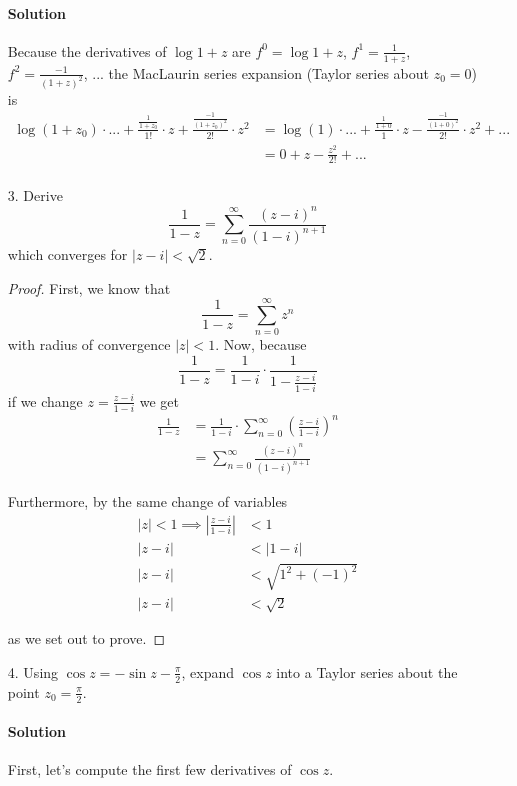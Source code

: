 \documentclass[11pt]{article}
\begin{document}
\begin{enumerate}
		\paragraph{Solution}
		Because the derivatives of $\log{1 + z}$ are $f^{0} = \log{1+z}$, $f^{1} = \frac{1}{1+z}$,
		$f^{2} = \frac{-1}{(1+z)^2}$, ...
		the MacLaurin series expansion (Taylor series about $z_0 = 0$) is
		\[
		\begin{aligned}
		\log(1 + z_0) \cdot ... + \frac{\frac{1}{1+z_0}}{1!}\cdot z +
		\frac{\frac{-1}{(1+z_0)^2}}{2!}\cdot z^2
		&= \log(1)\cdot ... + \frac{\frac{1}{1 + 0}}{1}\cdot z - \frac{\frac{-1}{(1+0)^2}}{2!} \cdot z^2 + ... \\
		&= 0 + z - \frac{z^2}{2!} + ...\\
		\end{aligned}
		\]
		\item[3.] Derive
		\[\frac{1}{1-z} = \sum^{\infty}_{n=0} \frac{(z-i)^n}{(1-i)^{n+1}} \]
		which converges for $|z - i| < \sqrt{2}$.
		\begin{proof}
			First, we know that
			\[\frac{1}{1-z} = \sum^{\infty}_{n=0} z^n \]
			with radius of convergence $|z| < 1$. Now, because
			\[\frac{1}{1-z} = \frac{1}{1-i}\cdot\frac{1}{1 - \frac{z-i}{1-i}}\]
			if we change $z = \frac{z-i}{1-i}$
			we get
			\[\begin{aligned}
			\frac{1}{1-z}
			&= \frac{1}{1-i}\cdot \sum^{\infty}_{n=0} (\frac{z-i}{1-i})^n \\
			&= \sum^{\infty}_{n=0} \frac{(z-i)^n}{(1-i)^{n+1}}
			\end{aligned}\]
			
			Furthermore, by the same change of variables
			\[\begin{aligned}
			|z| < 1 \implies |\frac{z-i}{1-i}| &< 1 \\
			|z-i| &< |1-i| \\
			|z-i| &< \sqrt{1^2 + (-1)^2} \\
			|z-i| &< \sqrt{2}
			\end{aligned}\]
			
			as we set out to prove.
		\end{proof}
	\item[4.] Using $\cos{z} = -\sin{z - \frac{\pi}{2}}$, expand $\cos{z}$ into a Taylor series about the point $z_0 = \frac{\pi}{2}$.
	
	\paragraph{Solution} First, let's compute the first few derivatives of $\cos{z}$.
	

\end{enumerate}
\end{document}
